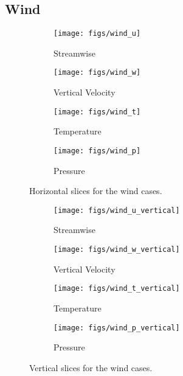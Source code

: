 \subsection{Wind}



%
%
\begin{figure}[htb]

 \begin{subfigure}{.5\textwidth}
  \centering
  \texttt{[image: figs/wind\_u]}
  \caption{Streamwise}
  \label{fig:vt-wind}
 \end{subfigure}%
 \begin{subfigure}{.5\textwidth}
  \centering
  \texttt{[image: figs/wind\_w]}
  \caption{Vertical Velocity}
  \label{fig:vz-wind}
 \end{subfigure}%


 \begin{subfigure}{.5\textwidth}
  \centering
  \texttt{[image: figs/wind\_t]}
  \caption{Temperature}
  \label{fig:t-wind}
 \end{subfigure}%
 \begin{subfigure}{.5\textwidth}
  \centering
  \texttt{[image: figs/wind\_p]}
  \caption{Pressure}
  \label{fig:p-wind}
 \end{subfigure}%

 \caption{Horizontal slices for the wind cases.}
 \label{fig:wind-hor}
\end{figure}

%
%
\begin{figure}[htb]

 \begin{subfigure}{.5\textwidth}
  \centering
  \texttt{[image: figs/wind\_u\_vertical]}
  \caption{Streamwise}
  \label{fig:vt-wind-vert}
 \end{subfigure}%
 \begin{subfigure}{.5\textwidth}
  \centering
  \texttt{[image: figs/wind\_w\_vertical]}
  \caption{Vertical Velocity}
  \label{fig:vz-wind-vert}
 \end{subfigure}%


 \begin{subfigure}{.5\textwidth}
  \centering
  \texttt{[image: figs/wind\_t\_vertical]}
  \caption{Temperature}
  \label{fig:t-wind-vert}
 \end{subfigure}%
 \begin{subfigure}{.5\textwidth}
  \centering
  \texttt{[image: figs/wind\_p\_vertical]}
  \caption{Pressure}
  \label{fig:p-wind-vert}
 \end{subfigure}%

 \caption{Vertical slices for the wind cases.}
 \label{fig:wind-ver}
\end{figure}

